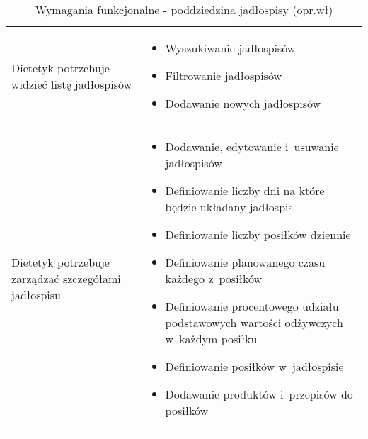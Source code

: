 
\begin{minipage}{\textwidth}
    \begin{table}[H]
        \centering\caption{Wymagania funkcjonalne - poddziedzina jadłospisy (opr.wł)\label{tabela:wymaganiaFunkcjonalneJadlospisy}}
        \begin{tabular}{|P{.3\textwidth}|P{.6\textwidth}|}
            \hline
             &  \\

            \hline
            Dietetyk potrzebuje widzieć listę jadłospisów &
            \begin{itemize}
                \item Wyszukiwanie jadłospisów
                \item Filtrowanie jadłospisów
                \item Dodawanie nowych jadłospisów
            \end{itemize} \\
            \hline
            Dietetyk potrzebuje zarządzać szczegółami jadłospisu &
            \begin{itemize}
                \item Dodawanie, edytowanie i~usuwanie jadłospisów
                \item Definiowanie liczby dni na które będzie układany jadłospis
                \item Definiowanie liczby posiłków dziennie
                \item Definiowanie planowanego czasu każdego z~posiłków
                \item Definiowanie procentowego udziału podstawowych wartości odżywczych w~każdym posiłku
                \item Definiowanie posiłków w~jadłospisie
                \item Dodawanie produktów i~przepisów do posiłków
            \end{itemize} \\
            \hline
        \end{tabular}
    \end{table}
\end{minipage}


